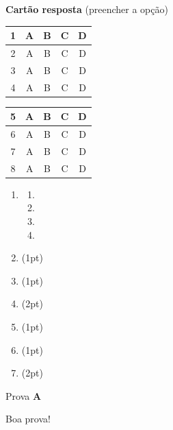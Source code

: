 \documentclass[a4paper]{article}
\begin{document}
\begin{multicols}{2}
{\bf Cartão resposta} (preencher a opção)

\begin{tabular}[!b]{|c|c|c|c|c|}
  \hline
  1 & A & B & C & D\\
  \hline
  2 & A & B & C & D\\
  \hline
  3 & A & B & C & D\\
  \hline
  4& A & B & C & D\\
  \hline
\end{tabular}
\begin{tabular}[!b]{|c|c|c|c|c|}
  \hline
  5 & A & B & C & D\\
  \hline
  6 & A & B & C & D\\
  \hline
  7& A & B & C & D\\
  \hline
  8 & A & B & C & D\\
  \hline
\end{tabular}

\begin{enumerate}
\item 
  \begin{enumerate}
  \item
  \item
  \item
  \item 
  \end{enumerate}

\vspace{0.1cm}

\item (1pt) 

\vspace{2cm}
\item (1pt) 

\vspace{3cm}
\item (2pt) 

\vspace{4cm}
\item (1pt) 

\vspace{3cm}

\item (1pt) 

\vspace{5cm}
\item (2pt) 


\vfill
\end{enumerate}
\end{multicols}

\newpage
{\hfill Prova {\bf\LARGE A}\par}

\vfill
\begin{center}Boa prova!\end{center}
\end{document}
